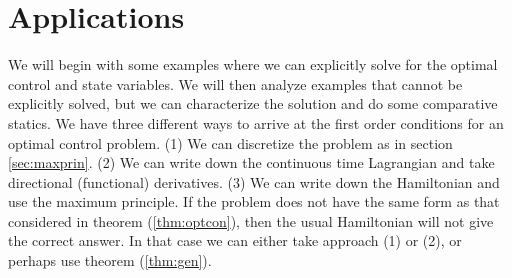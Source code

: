 
\section{Applications}

We will begin with some examples where we can explicitly solve for the
optimal control and state variables. We will then analyze examples
that cannot be explicitly solved, but we can characterize the solution
and do some comparative statics. We have three different ways to
arrive at the first order conditions for an optimal control
problem. (1) We can discretize the problem as in section
\ref{sec:maxprin}. (2) We can write down the continuous time
Lagrangian and take directional (functional) derivatives. (3) We can
write down the Hamiltonian and use the maximum principle. If the
problem does not have the same form as that considered in theorem
(\ref{thm:optcon}), then the usual Hamiltonian will not give the
correct answer. In that case we can either take approach (1) or (2),
or perhaps use theorem (\ref{thm:gen}).

